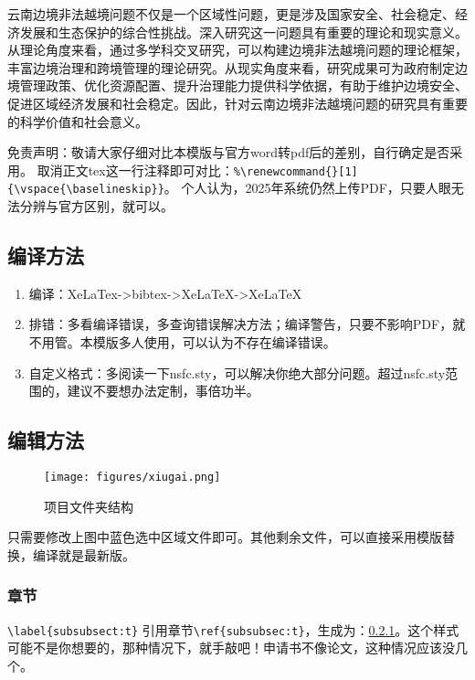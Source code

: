 云南边境非法越境问题不仅是一个区域性问题，更是涉及国家安全、社会稳定、经济发展和生态保护的综合性挑战。深入研究这一问题具有重要的理论和现实意义。从理论角度来看，通过多学科交叉研究，可以构建边境非法越境问题的理论框架，丰富边境治理和跨境管理的理论研究。从现实角度来看，研究成果可为政府制定边境管理政策、优化资源配置、提升治理能力提供科学依据，有助于维护边境安全、促进区域经济发展和社会稳定。因此，针对云南边境非法越境问题的研究具有重要的科学价值和社会意义。













免责声明：敬请大家仔细对比本模版与官方word转pdf后的差别，自行确定是否采用。
取消正文tex这一行注释即可对比：\verb|%\renewcommand{}[1]|\\
\verb|{\vspace{\baselineskip}}|。
个人认为，2025年系统仍然上传PDF，只要人眼无法分辨与官方区别，就可以。

\subsection{编译方法}
\begin{enumerate}
	\item 编译：XeLaTex->bibtex->XeLaTeX->XeLaTeX
	\item 排错：多看编译错误，多查询错误解决方法；编译警告，只要不影响PDF，就不用管。本模版多人使用，可以认为不存在编译错误。
	\item 自定义格式：多阅读一下nsfc.sty，可以解决你绝大部分问题。超过nsfc.sty范围的，建议不要想办法定制，事倍功半。
\end{enumerate}


\subsection{编辑方法}
\vspace{-5pt}

\begin{figure}[h!]
	\centering %
	\texttt{[image: figures/xiugai.png]}
	\captionsetup{justification=centering} %
	\caption{项目文件夹结构}
\end{figure}
只需要修改上图中蓝色选中区域文件即可。其他剩余文件，可以直接采用模版替换，编译就是最新版。

\subsubsection{章节}\label{subsubsec:t}
\verb|\label{subsubsect:t}|
引用章节\verb|\ref{subsubsec:t}|，生成为：\ref{subsubsec:t}。这个样式可能不是你想要的，那种情况下，就手敲吧！申请书不像论文，这种情况应该没几个。

